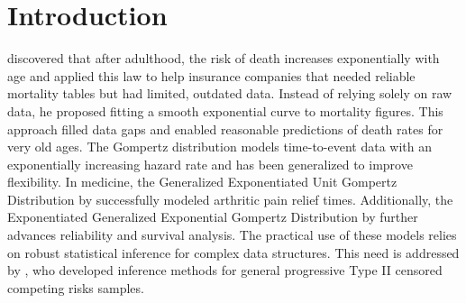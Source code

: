 \documentclass[twoside]{article}
\begin{document}
\section{Introduction}

\cite{gompertz1825xxiv} discovered that after adulthood, the risk of death increases exponentially with age and applied this law to help insurance companies that needed reliable mortality tables but had limited, outdated data. Instead of relying solely on raw data, he proposed fitting a smooth exponential curve to mortality figures. This approach filled data gaps and enabled reasonable predictions of death rates for very old ages.
The Gompertz distribution models time-to-event data with an exponentially increasing hazard rate and has been generalized to improve flexibility. In medicine, the Generalized Exponentiated Unit Gompertz Distribution by \cite{sindhu2024generalized} successfully modeled arthritic pain relief times. Additionally, the Exponentiated Generalized Exponential Gompertz Distribution by \cite{ezmareh2025exponentiated} further advances reliability and survival analysis. The practical use of these models relies on robust statistical inference for complex data structures. This need is addressed by \cite{lv2024statistical}, who developed inference methods for general progressive Type II censored competing risks samples. %
\end{document}
